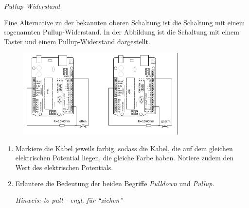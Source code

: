 \documentclass[ngerman, 11pt]{scrreprt}
\begin{document}
	\begin{aufgabe} \emph{Pullup-Widerstand}
		
		Eine Alternative zu der bekannten oberen Schaltung ist die Schaltung mit einem sogenannten Pullup-Widerstand. In der Abbildung ist die Schaltung mit einem Taster und einem Pullup-Widerstand dargestellt.
		
		\begin{figure}[H]
			\centering
			\includegraphics[width=0.75\textwidth]{../Zeichnungen/schaltplan-pullup.png}
		\end{figure}
		
		\begin{enumerate}[label=\alph*), itemsep=0ex, parsep=0ex]
			\item Markiere die Kabel jeweils farbig, sodass die Kabel, die auf dem gleichen elektrischen Potential liegen, die gleiche Farbe haben. Notiere zudem den Wert des elektrischen Potentials.
			\item Erläutere die Bedeutung der beiden Begriffe \emph{Pulldown} und \emph{Pullup}.
			
			\emph{Hinweis: to pull - engl. für \enquote{ziehen}}
		\end{enumerate}
	\end{aufgabe}
	
\end{document}
